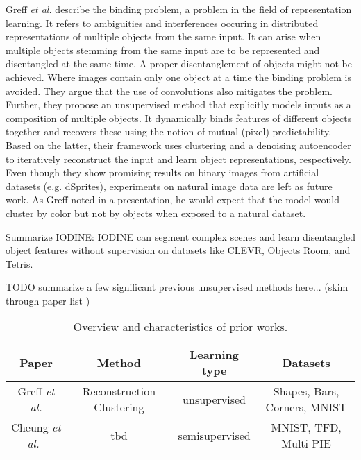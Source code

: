 \documentclass[12pt,a4paper]{article}
\begin{document}
\par Greff \textit{et al.} \cite{BindingRC} describe the binding problem, a problem in the field of representation learning. It refers to ambiguities and interferences occuring in distributed representations of multiple objects from the same input. It can arise when multiple objects stemming from the same input are to be represented and disentangled at the same time. A proper disentanglement of objects might not be achieved. Where images contain only one object at a time the binding problem is avoided. They argue that the use of convolutions also mitigates the problem. Further, they propose an unsupervised method that explicitly models inputs as a composition of multiple objects. It dynamically binds features of different objects together and recovers these using the notion of mutual (pixel) predictability. Based on the latter, their framework uses clustering and a denoising autoencoder to iteratively reconstruct the input and learn object representations, respectively. Even though they show promising results on binary images from artificial datasets (e.g. dSprites), experiments on natural image data are left as future work. As Greff noted in a presentation, he would expect that the model would cluster by color but not by objects when exposed to a natural dataset. 

Summarize IODINE: IODINE can segment complex scenes and learn disentangled object features without supervision on datasets like CLEVR, Objects Room, and Tetris.


TODO summarize a few significant previous unsupervised methods here... (skim through paper list )
\begin{table} [H]
\centering
\begin{tabular}{|c|c|c|c|}
\hline
\textbf{Paper} & \textbf{Method} & \textbf{Learning type} & \textbf{Datasets}\\
\hline
 Greff \textit{et al.} \cite{BindingRC} & Reconstruction Clustering & unsupervised & Shapes, Bars, Corners, MNIST \\
\hline
Cheung \textit{et al.}~\cite{DiscHiddenFoViDN} & tbd & semisupervised & MNIST, TFD, Multi-PIE \\
\hline
\end{tabular}
\caption{Overview and characteristics of prior works.} \label{tab:priorWorks}
\end{table}
\end{document}
